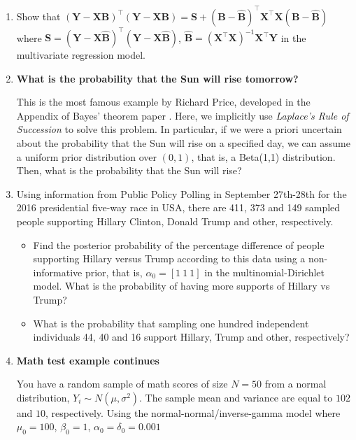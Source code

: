\begin{enumerate}
	\item Show that $({\bm{Y}}-{\bm{X}}{\bm{B}})^{\top}({\bm{Y}}-{\bm{X}}{\bm{B}})={\bm{S}}+({\bm{B}}-\widehat{\bm{B}})^{\top}{\bm{X}}^{\top}{\bm{X}}({\bm{B}}-\widehat{\bm{B}})$ where ${\bm{S}}= ({\bm{Y}}-{\bm{X}}\widehat{\bm{B}})^{\top}({\bm{Y}}-{\bm{X}}\widehat{\bm{B}})$, $\widehat{\bm{B}}= ({\bm{X}}^{\top}{\bm{X}})^{-1}{\bm{X}}^{\top}{\bm{Y}}$ in the multivariate regression model.
	
	\item \textbf{What is the probability that the Sun will rise tomorrow?}
	
	This is the most famous example by Richard Price, developed in the Appendix of Bayes' theorem paper \cite{bayes1763lii}. Here, we implicitly use \textit{Laplace's Rule of Succession} to solve this problem. In particular, if we were a priori uncertain about the probability that the Sun will rise on a specified day, we can assume a uniform prior distribution over \((0,1)\), that is, a Beta(1,1) distribution. Then, what is the probability that the Sun will rise?
	
	\item Using information from Public Policy Polling in September 27th-28th for the 2016 presidential five-way race in USA, there are 411, 373 and 149 sampled people supporting Hillary Clinton, Donald Trump and other, respectively. 
	
	\begin{itemize}
		\item Find the posterior probability of the percentage difference of people supporting Hillary versus Trump according to this data using a non-informative prior, that is, $\alpha_0=[1 \ 1 \ 1]$ in the multinomial-Dirichlet model. What is the probability of having more supports of Hillary vs Trump?
		
		\item What is the probability that sampling one hundred independent individuals 44, 40 and 16 support Hillary, Trump and other, respectively?  
	\end{itemize}

\item \textbf{Math test example continues}

You have a random sample of math scores of size $N=50$ from a normal distribution, $Y_i\sim {N}(\mu, \sigma^2)$. The sample mean and variance are equal to $102$ and $10$, respectively. Using the normal-normal/inverse-gamma model where $\mu_0=100$, $\beta_0=1$, $\alpha_0=\delta_0=0.001$


\end{enumerate}
